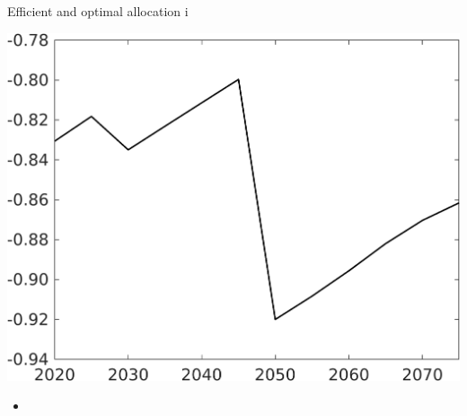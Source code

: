 \documentclass[11pt,aspectratio=169]{beamer}
\begin{document}
\begin{frame}{Efficient and optimal allocation i}
\begin{minipage}[]{0.32\textwidth}
		\includegraphics[width=1\textwidth]{../codding_model/own_basedOnFried/optimalPol_elastS_DisuSci/figures/all_1705/SWF_CompEffSP_T_onlyeff_spillover0_noskill0_sep1_BN0_ineq0_red0_xgrowth0_zero0_countec0_etaa0.79_lgd0.png}
	\end{minipage}
	
	\vspace{6mm}
	\begin{itemize}
		\item[] %
	\end{itemize}
\end{frame}
\end{document}
